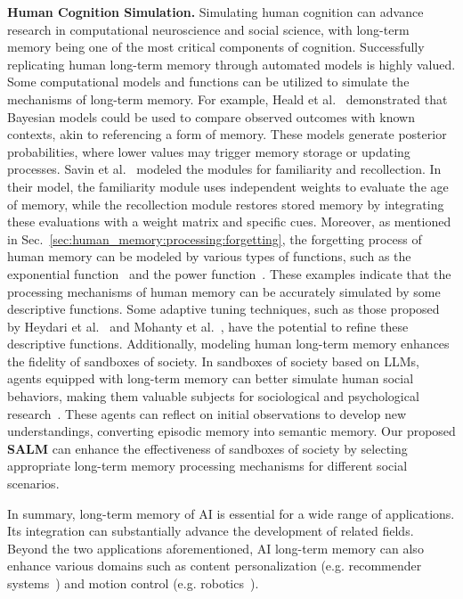 \documentclass[journal,hideappendix]{vgtc}
\newenvironment{j_itemize}{
\begin{itemize}[]
  \setlength{\itemsep}{3pt}
  \setlength{\parskip}{0pt}
  \setlength{\parsep}{0pt}
}{\end{itemize}}
\begin{document}
\begin{j_itemize}
    \item[$\bullet$] \textbf{Human Cognition Simulation.} Simulating human cognition can advance research in computational neuroscience and social science, with long-term memory being one of the most critical components of cognition. Successfully replicating human long-term memory through automated models is highly valued.
    Some computational models and functions can be utilized to simulate the mechanisms of long-term memory. For example, Heald et al.~\cite{heald2023contextual} demonstrated that Bayesian models could be used to compare observed outcomes with known contexts, akin to referencing a form of memory. These models generate posterior probabilities, where lower values may trigger memory storage or updating processes. Savin et al.~\cite{savin2011two} modeled the modules for familiarity and recollection. In their model, the familiarity module uses independent weights to evaluate the age of memory, while the recollection module restores stored memory by integrating these evaluations with a weight matrix and specific cues. Moreover, as mentioned in Sec.~\ref{sec:human_memory:processing:forgetting}, the forgetting process of human memory can be modeled by various types of functions, such as the exponential function~\cite{white1985characteristics} and the power function~\cite{wixted1997genuine}. These examples indicate that the processing mechanisms of human memory can be accurately simulated by some descriptive functions. Some adaptive tuning techniques, such as those proposed by Heydari et al.~\cite{heydari2019softadapt} and Mohanty et al.~\cite{mohanty2021adaptive}, have the potential to refine these descriptive functions. Additionally, modeling human long-term memory enhances the fidelity of sandboxes of society. In sandboxes of society based on LLMs, agents equipped with long-term memory can better simulate human social behaviors, making them valuable subjects for sociological and psychological research~\cite{lei2023recagent,park2023generative,he2024afspp}. These agents can reflect on initial observations to develop new understandings, converting episodic memory into semantic memory. Our proposed \textbf{SALM} can enhance the effectiveness of sandboxes of society by selecting appropriate long-term memory processing mechanisms for different social scenarios.

\end{j_itemize}

In summary, long-term memory of AI is essential for a wide range of applications. Its integration can substantially advance the development of related fields.
Beyond the two applications aforementioned, AI long-term memory can also enhance various domains such as content personalization  (e.g. recommender systems~\cite{zhao2020memory,ko2022survey,wu2023survey}) and motion control (e.g. robotics~\cite{pierson2017deep,zhao2020sim,soori2023artificial}).
\end{document}
